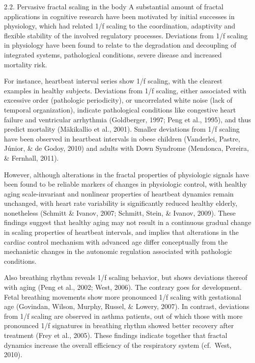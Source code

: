 \documentclass[12pt,]{book}
\begin{document}
2.2. Pervasive fractal scaling in the body
A substantial amount of fractal applications in cognitive research have been motivated by initial successes in physiology, which had related 1/f scaling to the coordination, adaptivity and flexible stability of the involved regulatory processes. Deviations from 1/f scaling in physiology have been found to relate to the degradation and decoupling of integrated systems, pathological conditions, severe disease and increased mortality risk.

For instance, heartbeat interval series show 1/f scaling, with the clearest examples in healthy subjects. Deviations from 1/f scaling, either associated with excessive order (pathologic periodicity), or uncorrelated white noise (lack of temporal organization), indicate pathological conditions like congestive heart failure and ventricular arrhythmia (Goldberger, 1997; Peng et al., 1995), and thus predict mortality (Mäkikallio et al., 2001). Smaller deviations from 1/f scaling have been observed in heartbeat intervals in obese children (Vanderlei, Pastre, Júnior, \& de Godoy, 2010) and adults with Down Syndrome (Mendonca, Pereira, \& Fernhall, 2011).

However, although alterations in the fractal properties of physiologic signals have been found to be reliable markers of changes in physiologic control, with healthy aging scale-invariant and nonlinear properties of heartbeat dynamics remain unchanged, with heart rate variability is significantly reduced healthy elderly, nonetheless (Schmitt \& Ivanov, 2007; Schmitt, Stein, \& Ivanov, 2009). These findings suggest that healthy aging may not result in a continuous gradual change in scaling properties of heartbeat intervals, and implies that alterations in the cardiac control mechanism with advanced age differ conceptually from the mechanistic changes in the autonomic regulation associated with pathologic conditions.

Also breathing rhythm reveals 1/f scaling behavior, but shows deviations thereof with aging (Peng et al., 2002; West, 2006). The contrary goes for development. Fetal breathing movements show more pronounced 1/f scaling with gestational age (Govindan, Wilson, Murphy, Russel, \& Lowery, 2007). In contrast, deviations from 1/f scaling are observed in asthma patients, out of which those with more pronounced 1/f signatures in breathing rhythm showed better recovery after treatment (Frey et al., 2005). These findings indicate together that fractal dynamics increase the overall efficiency of the respiratory system (cf.~West, 2010).
\end{document}
